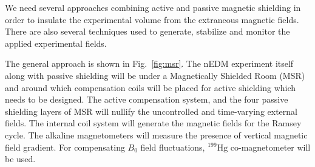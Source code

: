 We need several approaches combining active and passive magnetic shielding in order to insulate the experimental volume from the extraneous magnetic fields. There are also several techniques used to generate, stabilize and monitor the applied experimental fields. 


The general approach is shown in Fig.~\ref{fig:msr}. The nEDM experiment itself along with passive shielding will be under a Magnetically Shielded Room (MSR) and around which compensation coils will be placed for active shielding which needs to be designed. The active compensation system, and the four passive shielding layers of MSR will nullify the uncontrolled and time-varying external fields. The internal coil system will generate the magnetic fields for the Ramsey cycle. The alkaline magnetometers will measure the presence of vertical magnetic field gradient. For compensating $B_0$ field fluctuations, $^{199}\mathrm{Hg}$ co-magnetometer will be used.






